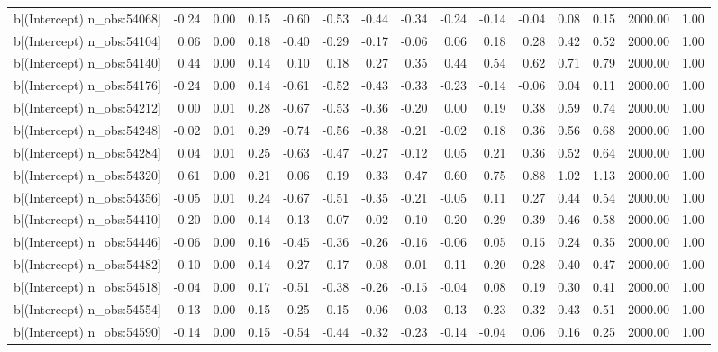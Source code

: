 \begin{table}[ht]
\begin{tabular}{rrrrrrrrrrrrrrr}
  b[(Intercept) n\_obs:54068] & -0.24 & 0.00 & 0.15 & -0.60 & -0.53 & -0.44 & -0.34 & -0.24 & -0.14 & -0.04 & 0.08 & 0.15 & 2000.00 & 1.00 \\ 
  b[(Intercept) n\_obs:54104] & 0.06 & 0.00 & 0.18 & -0.40 & -0.29 & -0.17 & -0.06 & 0.06 & 0.18 & 0.28 & 0.42 & 0.52 & 2000.00 & 1.00 \\ 
  b[(Intercept) n\_obs:54140] & 0.44 & 0.00 & 0.14 & 0.10 & 0.18 & 0.27 & 0.35 & 0.44 & 0.54 & 0.62 & 0.71 & 0.79 & 2000.00 & 1.00 \\ 
  b[(Intercept) n\_obs:54176] & -0.24 & 0.00 & 0.14 & -0.61 & -0.52 & -0.43 & -0.33 & -0.23 & -0.14 & -0.06 & 0.04 & 0.11 & 2000.00 & 1.00 \\ 
  b[(Intercept) n\_obs:54212] & 0.00 & 0.01 & 0.28 & -0.67 & -0.53 & -0.36 & -0.20 & 0.00 & 0.19 & 0.38 & 0.59 & 0.74 & 2000.00 & 1.00 \\ 
  b[(Intercept) n\_obs:54248] & -0.02 & 0.01 & 0.29 & -0.74 & -0.56 & -0.38 & -0.21 & -0.02 & 0.18 & 0.36 & 0.56 & 0.68 & 2000.00 & 1.00 \\ 
  b[(Intercept) n\_obs:54284] & 0.04 & 0.01 & 0.25 & -0.63 & -0.47 & -0.27 & -0.12 & 0.05 & 0.21 & 0.36 & 0.52 & 0.64 & 2000.00 & 1.00 \\ 
  b[(Intercept) n\_obs:54320] & 0.61 & 0.00 & 0.21 & 0.06 & 0.19 & 0.33 & 0.47 & 0.60 & 0.75 & 0.88 & 1.02 & 1.13 & 2000.00 & 1.00 \\ 
  b[(Intercept) n\_obs:54356] & -0.05 & 0.01 & 0.24 & -0.67 & -0.51 & -0.35 & -0.21 & -0.05 & 0.11 & 0.27 & 0.44 & 0.54 & 2000.00 & 1.00 \\ 
  b[(Intercept) n\_obs:54410] & 0.20 & 0.00 & 0.14 & -0.13 & -0.07 & 0.02 & 0.10 & 0.20 & 0.29 & 0.39 & 0.46 & 0.58 & 2000.00 & 1.00 \\ 
  b[(Intercept) n\_obs:54446] & -0.06 & 0.00 & 0.16 & -0.45 & -0.36 & -0.26 & -0.16 & -0.06 & 0.05 & 0.15 & 0.24 & 0.35 & 2000.00 & 1.00 \\ 
  b[(Intercept) n\_obs:54482] & 0.10 & 0.00 & 0.14 & -0.27 & -0.17 & -0.08 & 0.01 & 0.11 & 0.20 & 0.28 & 0.40 & 0.47 & 2000.00 & 1.00 \\ 
  b[(Intercept) n\_obs:54518] & -0.04 & 0.00 & 0.17 & -0.51 & -0.38 & -0.26 & -0.15 & -0.04 & 0.08 & 0.19 & 0.30 & 0.41 & 2000.00 & 1.00 \\ 
  b[(Intercept) n\_obs:54554] & 0.13 & 0.00 & 0.15 & -0.25 & -0.15 & -0.06 & 0.03 & 0.13 & 0.23 & 0.32 & 0.43 & 0.51 & 2000.00 & 1.00 \\ 
  b[(Intercept) n\_obs:54590] & -0.14 & 0.00 & 0.15 & -0.54 & -0.44 & -0.32 & -0.23 & -0.14 & -0.04 & 0.06 & 0.16 & 0.25 & 2000.00 & 1.00 \\ 

\end{tabular}
\end{table}
